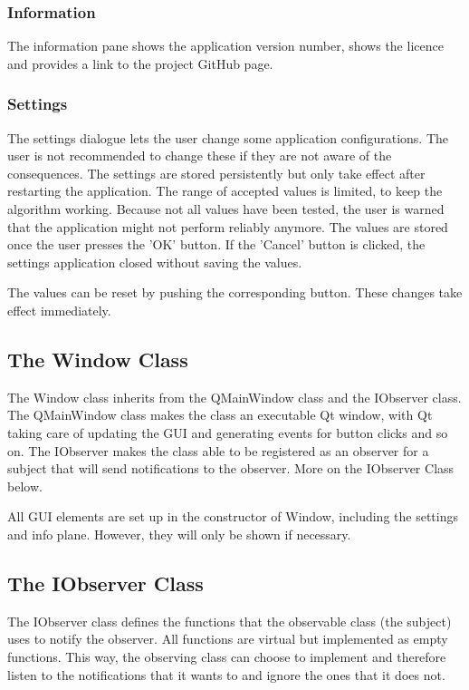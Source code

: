 \subsubsection{Information}
The information pane shows the application version number, shows the licence and provides a link to the project GitHub page.

\subsubsection{Settings}
The settings dialogue lets the user change some application configurations. The user is not recommended to change these if they are not aware of the consequences. The settings are stored persistently but only take effect after restarting the application. The range of accepted values is limited, to keep the algorithm working. Because not all values have been tested, the user is warned that the application might not perform reliably anymore. The values are stored once the user presses the 'OK' button. If the 'Cancel' button is clicked, the settings application closed without saving the values.

The values can be reset by pushing the corresponding button. These changes take effect immediately. 

\subsection{The Window Class}
The Window class inherits from the QMainWindow class and the IObserver class. The QMainWindow class makes the class an executable Qt window, with Qt taking care of updating the GUI and generating events for button clicks and so on. The IObserver makes the class able to be registered as an observer for a subject that will send notifications to the observer. More on the IObserver Class below.

All GUI elements are set up in the constructor of Window, including the settings and info plane. However, they will only be shown if necessary. 

\subsection{The IObserver Class}
The IObserver class defines the functions that the observable class (the subject) uses to notify the observer. All functions are virtual but implemented as empty functions. This way, the observing class can choose to implement and therefore listen to the notifications that it wants to and ignore the ones that it does not. 


